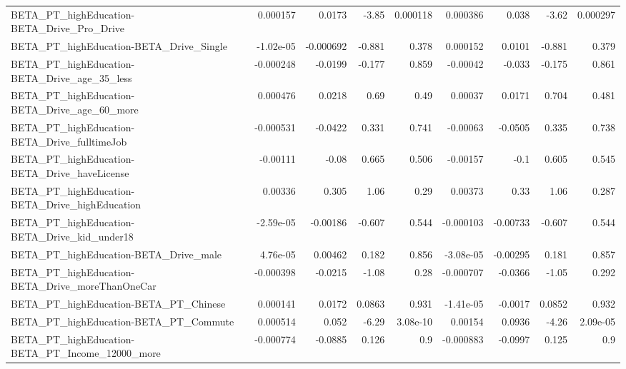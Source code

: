 \begin{tabular}{lrrrrrrrr}
BETA\_PT\_highEducation-BETA\_Drive\_Pro\_Drive         &    0.000157 &       0.0173 &    -3.85 & 0.000118 &   0.000386 &       0.038 &        -3.62 &      0.000297 \\
BETA\_PT\_highEducation-BETA\_Drive\_Single            &   -1.02e-05 &    -0.000692 &   -0.881 &    0.378 &   0.000152 &      0.0101 &       -0.881 &         0.379 \\
BETA\_PT\_highEducation-BETA\_Drive\_age\_35\_less       &   -0.000248 &      -0.0199 &   -0.177 &    0.859 &   -0.00042 &      -0.033 &       -0.175 &         0.861 \\
BETA\_PT\_highEducation-BETA\_Drive\_age\_60\_more       &    0.000476 &       0.0218 &     0.69 &     0.49 &    0.00037 &      0.0171 &        0.704 &         0.481 \\
BETA\_PT\_highEducation-BETA\_Drive\_fulltimeJob       &   -0.000531 &      -0.0422 &    0.331 &    0.741 &   -0.00063 &     -0.0505 &        0.335 &         0.738 \\
BETA\_PT\_highEducation-BETA\_Drive\_haveLicense       &    -0.00111 &        -0.08 &    0.665 &    0.506 &   -0.00157 &        -0.1 &        0.605 &         0.545 \\
BETA\_PT\_highEducation-BETA\_Drive\_highEducation     &     0.00336 &        0.305 &     1.06 &     0.29 &    0.00373 &        0.33 &         1.06 &         0.287 \\
BETA\_PT\_highEducation-BETA\_Drive\_kid\_under18       &   -2.59e-05 &     -0.00186 &   -0.607 &    0.544 &  -0.000103 &    -0.00733 &       -0.607 &         0.544 \\
BETA\_PT\_highEducation-BETA\_Drive\_male              &    4.76e-05 &      0.00462 &    0.182 &    0.856 &  -3.08e-05 &    -0.00295 &        0.181 &         0.857 \\
BETA\_PT\_highEducation-BETA\_Drive\_moreThanOneCar    &   -0.000398 &      -0.0215 &    -1.08 &     0.28 &  -0.000707 &     -0.0366 &        -1.05 &         0.292 \\
BETA\_PT\_highEducation-BETA\_PT\_Chinese              &    0.000141 &       0.0172 &   0.0863 &    0.931 &  -1.41e-05 &     -0.0017 &       0.0852 &         0.932 \\
BETA\_PT\_highEducation-BETA\_PT\_Commute              &    0.000514 &        0.052 &    -6.29 & 3.08e-10 &    0.00154 &      0.0936 &        -4.26 &      2.09e-05 \\
BETA\_PT\_highEducation-BETA\_PT\_Income\_12000\_more    &   -0.000774 &      -0.0885 &    0.126 &      0.9 &  -0.000883 &     -0.0997 &        0.125 &           0.9 \\

\end{tabular}
